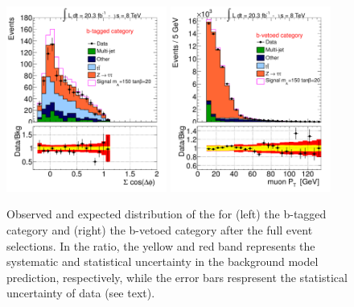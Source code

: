 \begin{figure}[!t]
     \begin{center}
            \includegraphics[page=8, width=0.47\textwidth]{figure/final_plots/BTag_fulll.pdf}
            \includegraphics[page=11,width=0.47\textwidth]{figure/final_plots/Bveto_final.pdf}

    \end{center}
    \caption{ Observed and expected distribution of the \mmc for (left) the b-tagged  category and (right) the b-vetoed category after
        the full event selections. In the ratio, the yellow and red band represents the systematic and statistical uncertainty in the background model prediction, 
	respectively,  while the error bars respresent the statistical uncertainty of data (see text).}
   \label{fig:mmc_categories}
\end{figure}

